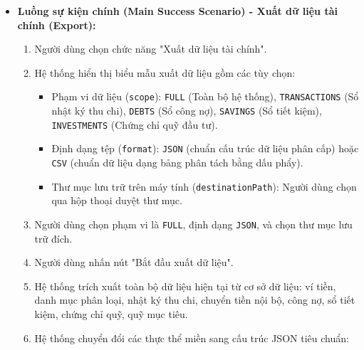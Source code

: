 \documentclass[11pt,a4paper]{article}
\providecommand{\tightlist}{
  \setlength{\itemsep}{0pt}\setlength{\parskip}{0pt}}
\begin{document}
\begin{itemize}
  \begin{enumerate}
  \def\labelenumi{\arabic{enumi}.}
  \tightlist
  \item
    Khi xuất dữ liệu: Tệp sao lưu được tạo thành công với mã hóa UTF-8,
    các trường số học \texttt{BigDecimal} được lưu dưới dạng chuỗi số
    học đầy đủ chữ số (không bị làm tròn, không dùng ký hiệu khoa học),
    tệp đặt tên tự động theo chuẩn
    \texttt{pfms\_export\_\{scope\}\_\{yyyyMMdd\_HHmmss\}.\{ext\}} theo
    quy tắc \texttt{FR-DAT-01}.
  \item
    Khi nhập dữ liệu: Dữ liệu từ tệp sao lưu được phục hồi trọn vẹn vào
    hệ thống theo chế độ đã chọn (\texttt{OVERWRITE} hoặc
    \texttt{MERGE}), toàn bộ các bất biến số dư \texttt{BR-FIN-02}, ghi
    sổ kép \texttt{BR-FIN-03} và danh mục \texttt{BR-FIN-04} được thỏa
    mãn 100\%.
  \item
    Nếu tệp nhập chứa dữ liệu lỗi: Toàn bộ thao tác bị hủy bỏ và
    rollback nguyên trạng, cơ sở dữ liệu hiện tại không bị thay đổi hoặc
    làm sai lệch.
  \item
    Khi kiểm toán: Báo cáo kiểm toán toàn vẹn dữ liệu (Data Integrity
    Audit Report) phản ánh trung thực trạng thái của 4 quy tắc bất biến
    cốt lõi theo \texttt{FR-DAT-03}.
  \end{enumerate}
\item
  \textbf{Luồng sự kiện chính (Main Success Scenario) - Xuất dữ liệu tài
  chính (Export):}

  \begin{enumerate}
  \def\labelenumi{\arabic{enumi}.}
  \tightlist
  \item
    Người dùng chọn chức năng "Xuất dữ liệu tài chính".
  \item
    Hệ thống hiển thị biểu mẫu xuất dữ liệu gồm các tùy chọn:

    \begin{itemize}
    \tightlist
    \item
      Phạm vi dữ liệu (\texttt{scope}): \texttt{FULL} (Toàn bộ hệ
      thống), \texttt{TRANSACTIONS} (Sổ nhật ký thu chi), \texttt{DEBTS}
      (Sổ công nợ), \texttt{SAVINGS} (Sổ tiết kiệm),
      \texttt{INVESTMENTS} (Chứng chỉ quỹ đầu tư).
    \item
      Định dạng tệp (\texttt{format}): \texttt{JSON} (chuẩn cấu trúc dữ
      liệu phân cấp) hoặc \texttt{CSV} (chuẩn dữ liệu dạng bảng phân
      tách bằng dấu phẩy).
    \item
      Thư mục lưu trữ trên máy tính (\texttt{destinationPath}): Người
      dùng chọn qua hộp thoại duyệt thư mục.
    \end{itemize}
  \item
    Người dùng chọn phạm vi là \texttt{FULL}, định dạng \texttt{JSON},
    và chọn thư mục lưu trữ đích.
  \item
    Người dùng nhấn nút "Bắt đầu xuất dữ liệu".
  \item
    Hệ thống trích xuất toàn bộ dữ liệu hiện tại từ cơ sở dữ liệu: ví
    tiền, danh mục phân loại, nhật ký thu chi, chuyển tiền nội bộ, công
    nợ, sổ tiết kiệm, chứng chỉ quỹ, quỹ mục tiêu.
  \item
    Hệ thống chuyển đổi các thực thể miền sang cấu trúc JSON tiêu chuẩn:


\end{enumerate}
\end{itemize}
\end{document}
